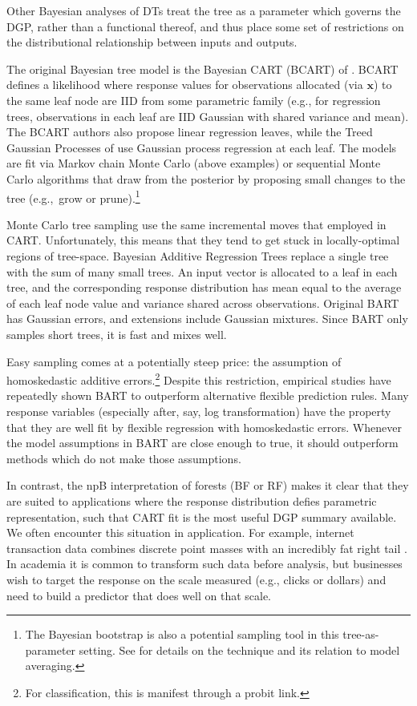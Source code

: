 \documentclass{article}
\begin{document}
Other Bayesian analyses of DTs treat the tree as
a parameter which governs the DGP, rather than a functional thereof, and thus
place some set of restrictions on the distributional relationship between
inputs and outputs.   

The original Bayesian tree model is the Bayesian CART (BCART) of
\citet{chipman_bayesian_1998}.
BCART defines a likelihood where response values for  observations  allocated
(via $\mathbf{x}$) to the same leaf node are IID from some parametric family
(e.g., for regression trees, observations in each leaf are IID Gaussian with
shared variance and mean).  The  BCART authors also propose linear regression
leaves, while the Treed Gaussian Processes  of
\citet{gramacy_bayesian_2008} use Gaussian process regression at each leaf.
The models are fit via Markov chain Monte Carlo (above examples) or sequential Monte Carlo \citep{taddy_dynamic_2011} algorithms that draw from the posterior by
proposing small changes to the tree (e.g.,~grow or prune).\footnote{The Bayesian bootstrap
is also a potential sampling tool in this tree-as-parameter setting. See
\citet{clyde_bagging_2001} for details on the technique and its relation to
model averaging.}

Monte Carlo tree sampling use the same incremental moves that employed in
 CART. Unfortunately, this means that they tend to get stuck in
 locally-optimal regions of tree-space.  Bayesian Additive Regression Trees
\citep[BART;][]{chipman_bart:_2010}  replace a single tree with the sum of
many small trees. An input vector is allocated to a leaf in each  tree, and
the corresponding response distribution has mean equal to the average of each
leaf node value and  variance shared across
observations. Original BART has Gaussian errors, and extensions include
Gaussian mixtures. Since BART only  samples  short trees, it is fast
and mixes well.

Easy
sampling comes at a potentially steep price: the assumption of homoskedastic
additive errors.\footnote{For classification, this is manifest  through a
probit link.} Despite this restriction, empirical studies have repeatedly shown BART to outperform
alternative flexible prediction rules. Many response variables 
(especially after, say, log transformation) have the property that they are well fit by
 flexible regression with homoskedastic errors.  Whenever the model
 assumptions in BART are close enough to true, it should outperform  methods which do not make those assumptions.  

In contrast, the npB interpretation of
forests (BF or RF)  makes it clear that they are suited to applications where
the response distribution defies parametric representation, such that CART fit
is the most useful DGP summary available. We  often encounter this situation in
application.  For example,  internet transaction data  combines discrete
point masses  with  an incredibly fat right tail \citep[e.g.,
see][]{taddy_heterogeneous_2014}.  In academia it is common to transform such
data before analysis, but businesses wish to target the response on the scale
measured (e.g., clicks or dollars) and  need to build a predictor that does
well on that scale.
\end{document}
